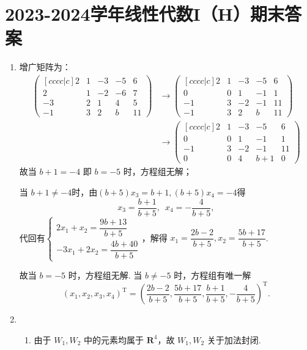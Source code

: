 \section{2023-2024学年线性代数I（H）期末答案}

\begin{enumerate}
    \item 增广矩阵为：
    \begin{align*}
        \begin{pmatrix}[cccc|c]
        2 & 1 & -3 & -5 & 6 \\
        2 & 1 & -2 & -6 & 7 \\
        -3 & 2 & 1 & 4 & 5 \\
        -1 & 3 & 2 & b & 11
        \end{pmatrix} & \to
        \begin{pmatrix}[cccc|c]
        2 & 1 & -3 & -5 & 6 \\
        0 & 0 & 1 & -1 & 1 \\
        -1 & 3 & -2 & -1 & 11 \\
        -1 & 3 & 2 & b & 11
        \end{pmatrix} \\
        & \to
        \begin{pmatrix}[cccc|c]
        2 & 1 & -3 & -5 & 6 \\
        0 & 0 & 1 & -1 & 1 \\
        -1 & 3 & -2 & -1 & 11 \\
        0 & 0 & 4 & b+1 & 0
        \end{pmatrix}
    \end{align*}
    故当 \(b+1=-4\) 即 \(b=-5\) 时，方程组无解；

    当 \(b+1\neq -4\)时，由\((b+5)x_3=b+1,(b+5)x_4=-4\)得
    \[ x_3=\frac{b+1}{b+5},\enspace x_4=-\frac{4}{b+5}, \]
    代回有\( \begin{cases}
        2x_1+x_2=\dfrac{9b+13}{b+5} \\[1.2em]
        -3x_1+2x_2=\dfrac{4b+40}{b+5}
    \end{cases} \)，解得 \(x_1=\dfrac{2b-2}{b+5},x_2=\dfrac{5b+17}{b+5}\).

    故当 \(b=-5\) 时，方程组无解. 当 \(b\neq -5\) 时，方程组有唯一解
    \[(x_1,x_2,x_3,x_4)^\mathrm{T}=\left(\frac{2b-2}{b+5},\frac{5b+17}{b+5},\frac{b+1}{b+5},-\frac{4}{b+5}\right)^\mathrm{T}.\]

    \item
    \begin{enumerate}
        \item 由于 \(W_1,W_2\) 中的元素均属于 \(\mathbf{R}^4\)，故 \(W_1,W_2\) 关于加法封闭.


\end{enumerate}
\end{enumerate}
